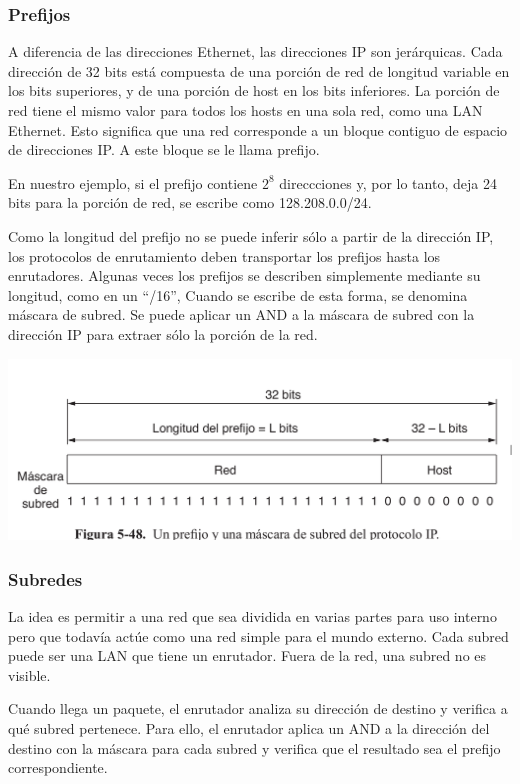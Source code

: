 	\subsubsection{Prefijos}
	A diferencia de las direcciones Ethernet, las direcciones IP son jerárquicas. Cada dirección de 32 bits está
	compuesta de una porción de red de longitud variable en los bits superiores, y de una porción de host en
	los bits inferiores. La porción de red tiene el mismo valor para todos los hosts en una sola red, como una
	LAN Ethernet. Esto significa que una red corresponde a un bloque contiguo de espacio de direcciones IP.
	A este bloque se le llama prefijo.
	\par En nuestro ejemplo, si el prefijo contiene $ 2^{8}$ direccciones y, por lo
	tanto, deja 24 bits para la porción de red, se escribe como 128.208.0.0/24.
	\par Como la longitud del prefijo no se puede inferir sólo a partir de la dirección IP, los protocolos de enrutamiento deben transportar los prefijos hasta los enrutadores. Algunas veces los prefijos se
describen simplemente mediante su longitud, como en un “/16”, Cuando se escribe
de esta forma, se denomina máscara de subred. Se puede aplicar un AND a la máscara de subred
con la dirección IP para extraer sólo la porción de la red.

	\begin{center}
		\includegraphics[scale=0.3]{./imagenes/prefijomascara.png} 
	\end{center}

	\subsubsection{Subredes}
	
	La idea es permitir a una red que sea dividida en varias partes para uso interno pero que todavía actúe como una red simple para el mundo externo.
	Cada subred puede ser una LAN que tiene un enrutador. Fuera de la red, una subred no es visible.	
	\par Cuando llega un paquete, el enrutador analiza su dirección de destino y verifica a qué subred pertenece. Para ello, el enrutador aplica un AND a la dirección del destino con la máscara para cada subred y verifica que el resultado sea el prefijo correspondiente.
	
